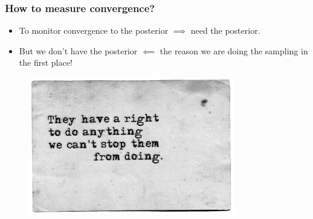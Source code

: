 \documentclass[handout]{beamer}
\begin{document}
\begin{frame}
\frametitle{How to measure convergence?}
\begin{itemize}
\item<2-> To monitor convergence to the posterior $\implies$ need the posterior.
\item<3-> But we don't have the posterior $\impliedby$ the reason we are doing the sampling in the first place!
\end{itemize}

\begin{figure}[ht]
\centerline{\includegraphics[width=0.8\textwidth]{animations_figures/catch-22-quote.jpg}}
\end{figure}

\end{frame}
\end{document}
